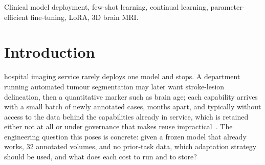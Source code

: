 \iffull\documentclass[journal]{IEEEtran}\else\documentclass[journal,twoside,web]{ieeecolor}\usepackage{generic}\fi
\begin{document}
\begin{abstract}
Adding a task to a deployed 3D brain-MRI model means a few dozen annotated cases, no access to earlier tasks' data, and a choice among adaptation strategies spanning four orders of magnitude of trainable parameters. We compared eleven strategies, from linear probing, bias-only tuning, LoRA and bottleneck adapters to full fine-tuning, EWC, LwF and replay, on nine tasks from six cohorts at 32 labelled volumes, with subject-grouped whole-volume evaluation and the training run as the unit of inference. Most of the difference between strategies lay in how the task head was fitted. Leaving a 66-parameter segmentation output projection frozen cost 0.06 to 0.42 Dice on every seed; with the inherited decoder trained on a frozen encoder, LoRA led it on no task. On brain age and sex a gradient-trained linear probe returned a constant, yet the same probe fitted in closed form on standardised frozen features matched LoRA on IXI sex; updating the encoder helped only on the second cohort. Full fine-tuning at its own learning rate was the most accurate single-task adaptation, but a second task erased the first; EWC recovered a third of the loss at the shared rate only, and only freezing shared weights gave zero forgetting. Adapters buy storage, not accuracy, and a nnU-Net trained from scratch on the same 32 cases beat every adaptation of the backbone by 0.08 to 0.23 Dice on three of four segmentation tasks. We release the protocol and a checklist of four comparison choices that each altered a conclusion.
\end{abstract}

\begin{IEEEkeywords}
Clinical model deployment, few-shot learning, continual learning, parameter-efficient fine-tuning, LoRA, 3D brain MRI.
\end{IEEEkeywords}

\section{Introduction}
\label{sec:introduction}

 hospital imaging service rarely deploys one model and stops. A department running automated tumour segmentation may later want stroke-lesion delineation, then a quantitative marker such as brain age; each capability arrives with a small batch of newly annotated cases, months apart, and typically without access to the data behind the capabilities already in service, which is retained either not at all or under governance that makes reuse impractical~\cite{fomo2025,baseline}. The engineering question this poses is concrete: given a frozen model that already works, 32 annotated volumes, and no prior-task data, which adaptation strategy should be used, and what does each cost to run and to store?
\end{document}
